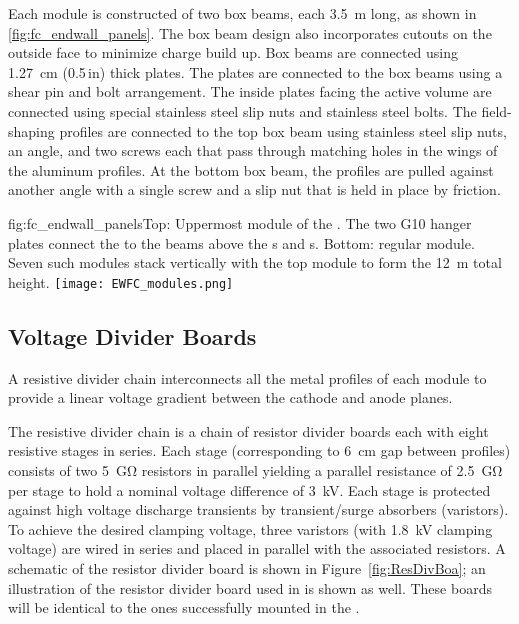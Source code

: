 Each  module is constructed of two  box beams, each \SI{3.5}{\m} long, as shown in \ref{fig:fc_endwall_panels}. 
The box beam design also incorporates cutouts on the outside face to minimize charge build up. Box beams are connected using \SI{1.27}{\cm} (\num{0.5}\,in) thick  plates. The plates are connected to the box beams using a shear pin and bolt arrangement. The inside plates facing the active volume are connected using special stainless steel slip nuts and stainless steel bolts. The field-shaping profiles are connected to the top box beam using stainless steel slip nuts, an  angle, and two screws each that pass through matching holes in the wings of the aluminum profiles. At the bottom box beam, the profiles are pulled against another  angle with a single screw and a slip nut that is held in place by friction.

\begin{dunefigure}{fig:fc_endwall_panels}{Top: Uppermost module of the . The two G10 hanger plates connect the  to the  beams above the s and s. Bottom: regular  module. Seven such modules stack vertically with the top module to form the \SI{12}{m} total height.}
\texttt{[image: EWFC\_modules.png]}
\end{dunefigure}



\subsection{Voltage Divider Boards}
\label{sec:fdsp-hv-des-fc-vdb}

A resistive divider chain interconnects all the metal profiles of each  module to provide a linear voltage gradient between the cathode and anode planes.

The resistive divider chain is %
 a chain of resistor divider boards each with %
eight resistive stages in series. 
 Each stage (corresponding to \SI{6}{cm} gap between  profiles) consists of two \SI{5}{\giga\ohm} resistors in parallel yielding a parallel resistance of \SI{2.5}{\giga\ohm} per stage to hold a nominal voltage difference of \SI{3}{kV}. Each stage is protected against high voltage discharge transients by transient/surge absorbers (varistors). To achieve the desired clamping voltage, three varistors (with \SI{1.8}{kV} clamping voltage) are wired in series and placed in parallel with the associated resistors. A schematic of the resistor divider board is shown in Figure~\ref{fig:ResDivBoa}; an illustration of the resistor divider board used in  is shown as well.
These boards will be identical to the ones successfully mounted in the  . 

